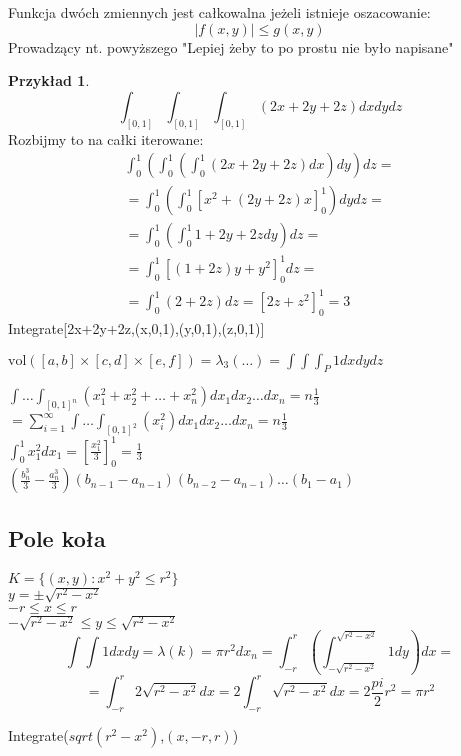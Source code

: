 \documentclass{article}
\theoremstyle{definition}
\theoremstyle{definition}
\theoremstyle{definition}
\newtheorem{pk}{Przykład}[subsection]
\theoremstyle{definition}
\begin{document}
Funkcja dwóch zmiennych jest całkowalna jeżeli istnieje oszacowanie:
\[|f(x,y)| \leq g(x,y)\]
Prowadzący nt. powyższego "Lepiej żeby to po prostu nie było napisane"

\begin{pk}
    \[\int_{[0,1]} \int_{[0,1]} \int_{[0,1]} (2x+2y+2z) dx dy dz\]
    Rozbijmy to na całki iterowane:
    \begin{align}
        \int_0^1 \left( \int_0^1 \left( \int_0^1 (2x+2y+2z) dx \right) dy \right) dz =\\
        =\int_0^1 \left( \int_0^1 \left[x^2 + (2y+2z)x\right]_0^1 \right) dy dz= \\
        =\int_0^1 \left( \int_0^1 1+2y+2z dy \right) dz=\\
        =\int_0^1 \left[(1+2z)y + y^2\right]_0^1 dz=\\
        =\int_0^1 (2+2z) dz = \left[2z+z^2\right]_0^1 = 3
    \end{align}
    Integrate[2x+2y+2z,(x,0,1),(y,0,1),(z,0,1)]
\end{pk}
$\text{vol}([a,b]\times[c,d]\times[e,f]) = \lambda_3(\dots) = \int\int\int_P 1 dx dy dz$

$\int \dots \int_{[0,1]^n} (x_1^2 + x_2^2 + \dots + x_n^2) dx_1dx_2 \dots dx_n = n \frac{1}{3}$\\
$=\sum_{i=1}^{\infty} \int \dots \int_{[0,1]^2} (x_i^2) dx_1 dx_2 \dots dx_n = n \frac{1}{3}$\\
$\int_0^1 x_1^2 dx_1 = \left[\frac{x_1^2}{3}\right]_0^1 = \frac{1}{3}$\\
$(\frac{b_n^3}{3} - \frac{a_n^3}{3})(b_{n-1} - a_{n-1})(b_{n-2} - a_{n-1})\dots(b_1-a_1)$\\

\subsection{Pole koła}

$K=\{(x,y): x^2 + y^2 \leq r^2\}$\\
$y=\pm\sqrt{r^2-x^2}$\\
$-r \leq x \leq r$\\
$-\sqrt{r^2-x^2} \leq y \leq \sqrt{r^2-x^2}$
\[\int \int 1 dx dy = \lambda(k) = \pi r^2 dx_n = \int_{-r}^{r} \left(\int_{-\sqrt{r^2-x^2}}^{\sqrt{r^2-x^2}} 1 dy \right) dx =\]
\[=\int_{-r}^{r} 2\sqrt{r^2-x^2} dx = 2 \int_{-r}^{r} \sqrt{r^2-x^2} dx = 2 \frac{pi}{2} r^2 = \pi r^2\]

Integrate($sqrt(r^2-x^2)$,$(x,-r,r)$)\\
\end{document}
